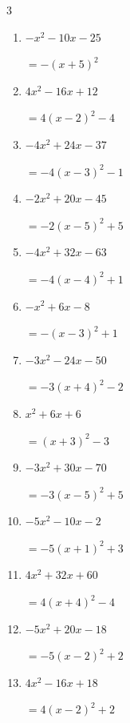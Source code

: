 \begin{multicols}{3}
\begin{enumerate}
        $=-4\left( x-4\right)^{2}-3$

  \item $-x^{2}-10x-25$

        $=-\left( x+5\right)^{2}$

  \item $4x^{2}-16x+12$

        $=4\left( x-2\right)^{2}-4$

  \item $-4x^{2}+24x-37$

        $=-4\left( x-3\right)^{2}-1$

\columnbreak %

  \item $-2x^{2}+20x-45$

        $=-2\left( x-5\right)^{2}+5$

  \item $-4x^{2}+32x-63$

        $=-4\left( x-4\right)^{2}+1$

  \item $-x^{2}+6x-8$

        $=-\left( x-3\right)^{2}+1$

  \item $-3x^{2}-24x-50$

        $=-3\left( x+4\right)^{2}-2$

  \item $x^{2}+6x+6$

        $=\left( x+3\right)^{2}-3$

  \item $-3x^{2}+30x-70$

        $=-3\left( x-5\right)^{2}+5$

  \item $-5x^{2}-10x-2$

        $=-5\left( x+1\right)^{2}+3$

  \item $4x^{2}+32x+60$

        $=4\left( x+4\right)^{2}-4$

  \item $-5x^{2}+20x-18$

        $=-5\left( x-2\right)^{2}+2$

  \item $4x^{2}-16x+18$

        $=4\left( x-2\right)^{2}+2$

\columnbreak %

\resetques


\end{enumerate}
\end{multicols}
